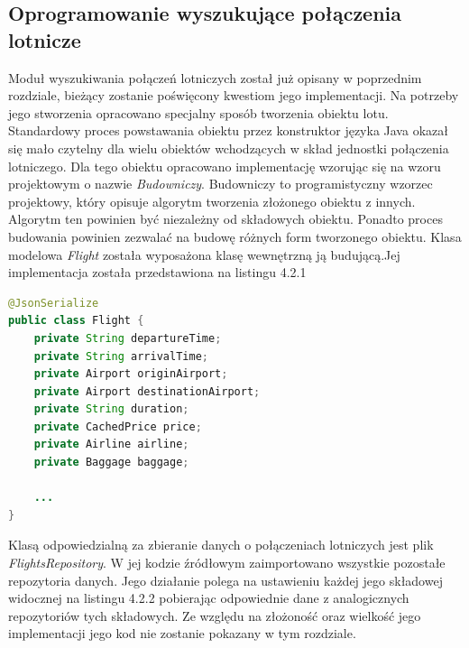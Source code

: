\documentclass[12pt, twoside]{report}
\begin{document}
\subsection{Oprogramowanie wyszukujące połączenia lotnicze}
Moduł wyszukiwania połączeń lotniczych został już opisany w poprzednim rozdziale, bieżący zostanie poświęcony kwestiom jego implementacji. Na potrzeby jego stworzenia opracowano specjalny sposób tworzenia obiektu lotu. Standardowy proces powstawania obiektu przez konstruktor języka Java okazał się mało czytelny dla wielu obiektów wchodzących w skład jednostki połączenia lotniczego. Dla tego obiektu opracowano implementację wzorując się na wzoru projektowym o nazwie \textit{Budowniczy}. Budowniczy to programistyczny wzorzec projektowy, który opisuje algorytm tworzenia złożonego obiektu z innych. Algorytm ten powinien być niezależny od składowych obiektu. Ponadto proces budowania powinien zezwalać na budowę różnych form tworzonego obiektu.\cite{builder}
Klasa modelowa \textit{Flight} została wyposażona klasę wewnętrzną ją budującą.Jej implementacja została przedstawiona na listingu 4.2.1
\begin{lstlisting}[language=java, caption=Fragment klasy Flight]
@JsonSerialize
public class Flight {
    private String departureTime;
    private String arrivalTime;
    private Airport originAirport;
    private Airport destinationAirport;
    private String duration;
    private CachedPrice price;
    private Airline airline;
    private Baggage baggage;
    
    ...
}
\end{lstlisting}
 \noindent Klasą odpowiedzialną za zbieranie danych o połączeniach lotniczych jest plik \textit{FlightsRepository}. W jej kodzie źródłowym zaimportowano wszystkie pozostałe repozytoria danych. Jego działanie polega na ustawieniu każdej jego składowej widocznej na listingu 4.2.2 pobierając odpowiednie dane z analogicznych repozytoriów tych składowych. Ze względu na złożoność oraz wielkość jego implementacji jego kod nie zostanie pokazany w tym rozdziale.
\end{document}
